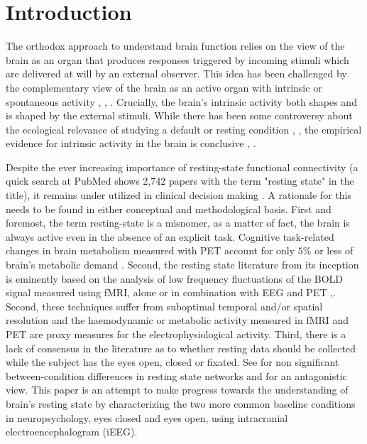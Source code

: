 \documentclass[11pt, onecolumn]{article}
\begin{document}
\section{Introduction}
The orthodox approach to understand brain function relies on the view of the brain as an organ that produces responses triggered by incoming stimuli which are delivered at will by an external observer. This idea has been challenged by the complementary view of the brain as an active organ with intrinsic or spontaneous activity \citep{llinas_intrinsic_1988}, \citep{biswal_functional_1995}, \citep{papo2013should}. Crucially, the brain's intrinsic activity both shapes and is shaped by the external stimuli.
While there has been some controversy about the ecological relevance of studying a default or resting condition \citep{buckner2007unrest}, \citep{morcom2007does}, the empirical evidence for intrinsic activity in the brain is conclusive \citep{wang2006changes}, \citep{mantini2007electrophysiological}. 

Despite the ever increasing importance of resting-state functional connectivity (a quick search at PubMed shows 2,742 papers with the term "resting state" in the title), it remains under utilized in clinical decision making \citep{tracy2015resting}.
A rationale for this needs to be found in either conceptual and methodological basis. First and foremost, the term resting-state is a misnomer, as a matter of fact, the brain is always active even in the absence of an explicit task. Cognitive task-related changes in brain metabolism measured with PET account for only $5\%$ or less of brain's metabolic demand \citep{sokoloff1955effect}. 
Second, the resting state literature from its inception is eminently based on the analysis of low frequency fluctuations of the BOLD signal measured using fMRI, alone or in combination with EEG and PET \citep{van2010exploring},\citep{musso2010spontaneous}. Second, these techniques suffer from suboptimal temporal and/or spatial resolution and the haemodynamic or metabolic activity measured in fMRI and PET are proxy measures for the electrophysiological activity. Third, there is a lack of consensus in the literature as to whether resting data should be collected while the subject has the eyes open, closed or fixated. See \citep{patriat2013effect} for non significant between-condition differences in resting state networks and \citep{yan2009spontaneous} for an antagonistic view. 
This paper is an attempt to make progress towards the understanding of brain's resting state by characterizing the two more common baseline conditions in neuropsychology, eyes closed and eyes open, using intracranial electroencephalogram (iEEG).
\end{document}
